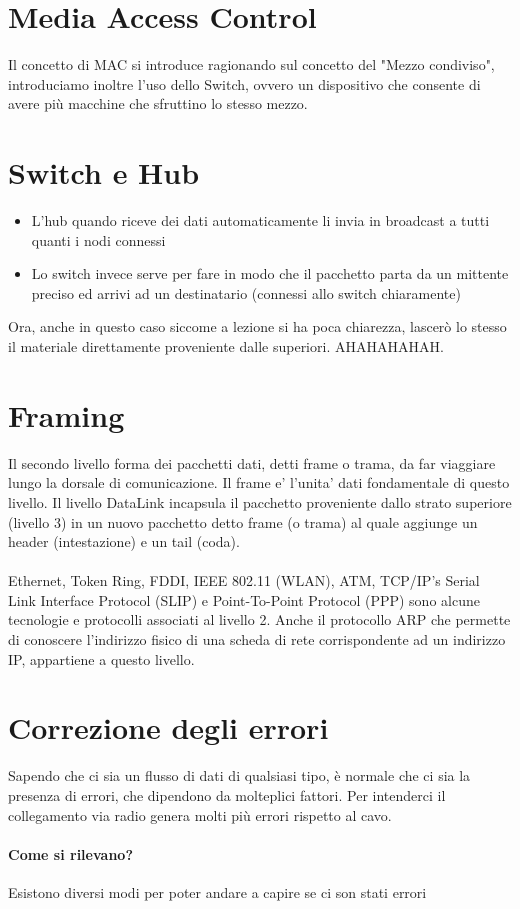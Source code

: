 \documentclass[12pt, a4paper, openany, twoside]{book}
\begin{document}
\section{Media Access Control}
Il concetto di MAC si introduce ragionando sul concetto del "Mezzo condiviso",
introduciamo inoltre l'uso dello Switch, ovvero un dispositivo che consente
di avere più macchine che sfruttino lo stesso mezzo. 
\section{Switch e Hub}
\begin{itemize}
	\item L'hub quando riceve dei dati automaticamente li invia in broadcast 
	a tutti quanti i nodi connessi
	\item Lo switch invece serve per fare in modo che il pacchetto parta da un
	mittente preciso ed arrivi ad un destinatario (connessi allo switch 
	chiaramente)
\end{itemize}
Ora, anche in questo caso siccome a lezione si ha poca chiarezza, lascerò
lo stesso il materiale direttamente proveniente dalle superiori.
AHAHAHAHAH.
\section{Framing}
Il secondo livello forma dei pacchetti dati, detti frame o trama, da far 
viaggiare lungo la dorsale di comunicazione. Il frame e' l'unita' dati 
fondamentale di questo livello. Il livello DataLink incapsula il pacchetto 
proveniente dallo strato superiore (livello 3) in un nuovo pacchetto detto
frame (o trama) al quale aggiunge un header (intestazione) e un tail (coda).\\ \\
Ethernet, Token Ring, FDDI, IEEE 802.11 (WLAN), ATM, TCP/IP's Serial Link 
Interface Protocol (SLIP) e Point-To-Point Protocol (PPP) sono alcune 
tecnologie e protocolli associati al livello 2. Anche il protocollo 
ARP che permette di conoscere l'indirizzo fisico di una scheda di rete 
corrispondente ad un indirizzo IP, appartiene a questo livello. 
\section{Correzione degli errori}
Sapendo che ci sia un flusso di dati di qualsiasi tipo, è normale che ci sia la
presenza di errori, che dipendono da molteplici fattori. Per intenderci 
il collegamento via radio genera molti più errori rispetto al cavo.
\paragraph{Come si rilevano? }Esistono diversi modi per poter andare a capire
se ci son stati errori 
\end{document}
